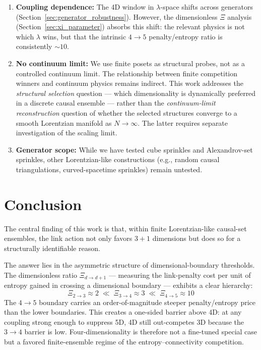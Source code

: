 \documentclass[12pt,a4paper]{article}
\begin{document}
\begin{enumerate}
  \item \textbf{Coupling dependence:} The 4D window in $\lambda$-space shifts across
    generators (Section~\ref{sec:generator_robustness}).
    However, the dimensionless $\Xi$ analysis (Section~\ref{sec:xi_parameter}) absorbs
    this shift: the relevant physics is not which $\lambda$ wins,
    but that the intrinsic $4{\to}5$ penalty/entropy ratio is consistently $\sim 10$.

  \item \textbf{No continuum limit:} We use finite posets as structural probes,
    not as a controlled continuum limit.
    The relationship between finite competition winners and continuum physics remains indirect.
    This work addresses the \emph{structural selection} question --- which dimensionality
    is dynamically preferred in a discrete causal ensemble --- rather than the
    \emph{continuum-limit reconstruction} question of whether the selected structures
    converge to a smooth Lorentzian manifold as $N \to \infty$.
    The latter requires separate investigation of the scaling limit.

  \item \textbf{Generator scope:} While we have tested cube sprinkles and Alexandrov-set sprinkles,
    other Lorentzian-like constructions (e.g., random causal triangulations,
    curved-spacetime sprinkles) remain untested.
\end{enumerate}


\section{Conclusion}
\label{sec:conclusion}

The central finding of this work is that, within finite Lorentzian-like causal-set
ensembles, the link action not only favors $3{+}1$ dimensions but does so for a
structurally identifiable reason.

The answer lies in the asymmetric structure of dimensional-boundary thresholds.
The dimensionless ratio $\Xi_{d \to d+1}$ --- measuring the link-penalty cost per unit of
entropy gained in crossing a dimensional boundary --- exhibits a clear hierarchy:
\begin{equation}
\Xi_{2 \to 3} \approx 2 \;\ll\; \Xi_{3 \to 4} \approx 3 \;\ll\; \Xi_{4 \to 5} \approx 10
\label{eq:xi_hierarchy}
\end{equation}
The $4{\to}5$ boundary carries an order-of-magnitude steeper penalty/entropy price than the
lower boundaries. This creates a one-sided barrier above 4D: at any coupling strong
enough to suppress 5D, 4D still out-competes 3D because the $3{\to}4$ barrier is low.
Four-dimensionality is therefore not a fine-tuned special case but a favored
finite-ensemble regime of the entropy--connectivity competition.
\end{document}
